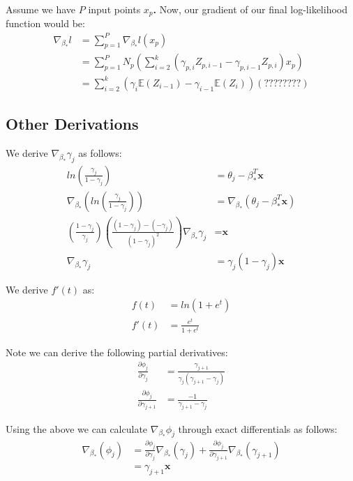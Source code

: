 \documentclass[a4paper, 11pt]{article}
\begin{document}
Assume we have $P$ input points \textbf{$x_p$.} Now, our gradient of our final log-likelihood function would be:
\begin{align}
    \nabla_{\beta_*}l &= \sum_{p=1}^P\nabla_{\beta_*}l(\textbf{$x_p$}) \\
    &= \sum_{p=1}^P N_p \left( \sum_{i=2}^k \left( \gamma_{p,i} Z_{p,i-1} - \gamma_{p,i-1} Z_{p,i} \right) \textbf{$x_p$} \right) \\
    &= \sum_{i=2}^k \left( \gamma_{i} \mathds{E}(Z_{i-1}) - \gamma_{i-1} \mathds{E}(Z_i) \right) (????????)
\end{align}

\subsection{Other Derivations}
We derive $\nabla_{\beta_*} \gamma_j$ as follows:
\begin{align}
    ln\left(\frac{\gamma_j}{1 - \gamma_j}\right) &= \theta_j - \beta_*^T\textbf{x} \\
    \nabla_{\beta_*} \left( ln\left(\frac{\gamma_j}{1 - \gamma_j}\right) \right) &= \nabla_{\beta_*} \left( \theta_j - \beta_*^T\textbf{x} \right) \\
    \left( \frac{1 - \gamma_j}{\gamma_j} \right) \left( \frac{(1 - \gamma_j) - (-\gamma_j)}{(1 - \gamma_j)^2} \right) \nabla_{\beta_*}\gamma_j &= \textbf{x} \\
    \nabla_{\beta_*}\gamma_j &= \gamma_j(1 - \gamma_j)\textbf{x}
\end{align}

We derive $f'(t)$ as:
\begin{align}
    f(t) &= ln(1+e^t) \\
    f'(t) &= \frac{e^t}{1+e^t}
\end{align}

Note we can derive the following partial derivatives:
\begin{align}
    \frac{\partial \phi_j}{\partial \gamma_j} &= \frac{\gamma_{j+1}}{\gamma_j(\gamma_{j+1} - \gamma_j)} \\
    \frac{\partial \phi_j}{\partial \gamma_{j+1}} &= \frac{-1}{\gamma_{j+1} - \gamma_j}
\end{align}

Using the above we can calculate $\nabla_{\beta_*} \phi_j$ through exact differentials as follows:
\begin{align}
    \nabla_{\beta_*}(\phi_j) &= \frac{\partial \phi_j}{\partial \gamma_j}\nabla_{\beta_*}(\gamma_j) + \frac{\partial \phi_j}{\partial \gamma_{j+1}}\nabla_{\beta_*}(\gamma_{j+1}) \\
    &= \gamma_{j+1}\textbf{x}
\end{align}


\end{document}

